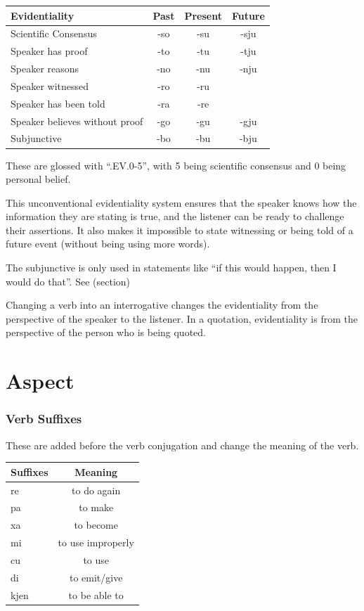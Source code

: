 \documentclass{clgrammar}
\begin{document}
\begin{center}
	\begin{tabular}{l|c|c|c} \label{verbs}
		Evidentiality        & Past & Present & Future \\
		\hline
		Scientific Consensus & -so  & -su     &  -sju  \\
		Speaker has proof    & -to  & -tu     &  -tju  \\
		Speaker reasons      & -no  & -nu     &  -nju  \\
		Speaker witnessed    & -ro  & -ru     &        \\
		Speaker has been told    & -ra  & -re     &  \\ 
		Speaker believes without proof & -go & -gu & -gju \\ 
		Subjunctive          & -bo  & -bu     &  -bju \\
	\end{tabular}
\end{center}	

These are glossed with ``.EV.0-5'', with 5 being scientific consensus and 0 being personal belief.


This unconventional evidentiality system ensures that the speaker knows how the information they are stating is true, and the listener can be ready to challenge their assertions. It also makes it impossible to state witnessing or being told of a future event (without being using more words). 

The subjunctive is only used in statements like ``if this would happen, then I would do that''. See (section)

Changing a verb into an interrogative changes the evidentiality from the perspective of the speaker to the listener. In a quotation, evidentiality is from the perspective of the person who is being quoted.


\chapter{Aspect}

\subsection{Verb Suffixes}
These are added before the verb conjugation and change the meaning of the verb. 

\begin{center}
	\begin{tabular}{l|c}
		Suffixes & Meaning \\
		\hline
		re & to do again\\
		pa & to make\\
		xa & to become \\
		mi & to use improperly\\
		cu & to use\\
		di & to emit/give\\
		kjen & to be able to \\
	\end{tabular}
\end{center}
\end{document}
